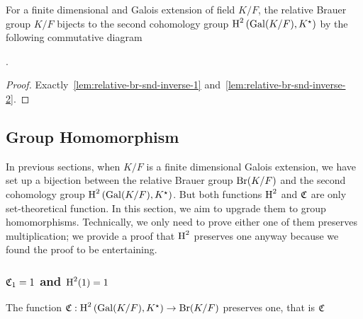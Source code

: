 \begin{corollary}\label{cor:relative-br-2nd-coh-bij}
  For a finite dimensional and Galois extension of field $K/F$, the relative Brauer group $K/F$ bijects to the second cohomology group $\operatorname{H}^{2}\left(\operatorname{Gal}(K/F), K^{\star}\right)$ by the following commutative diagram
  \begin{center}
  .
\end{center}
\leanok
{}
\end{corollary}

\begin{proof}
  Exactly~\cref{lem:relative-br-snd-inverse-1} and~\cref{lem:relative-br-snd-inverse-2}.
\end{proof}

\subsection{Group Homomorphism}

In previous sections, when $K/F$ is a finite dimensional Galois extension, we have set up a bijection between the relative Brauer group $\operatorname{Br}(K/F)$ and the second cohomology group $\operatorname{H}^{2}\left(\operatorname{Gal}(K/F), K^{\star}\right)$. But both functions $\operatorname{H}^{2}$ and $\operatorname{\mathfrak{C}}$ are only set-theoretical function. In this section, we aim to upgrade them to group homomorphisms. Technically, we only need to prove either one of them preserves multiplication; we provide a proof that $\operatorname{H}^{2}$ preserves one anyway because we found the proof to be entertaining.

\subsubsection{$\operatorname{\mathfrak{C}}_{1} = 1$ and $\operatorname{H}^{2}(1) = 1$}

\begin{theorem}
  \label{thm:map_one}
  The function $\operatorname{\mathfrak{C}}:\operatorname{H}^{2}\left(\operatorname{Gal}(K/F), K^{\star}\right) \to \operatorname{Br}(K/F)$ preserves one, that is $\operatorname{\mathfrak{C}}_{}$
 \leanok
\end{theorem}

